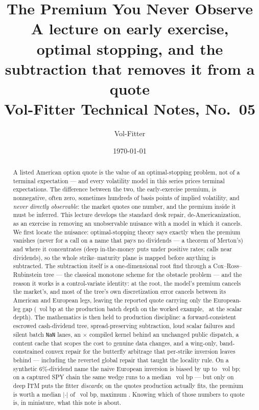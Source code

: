 \documentclass[11pt]{article}
\title{\textbf{The Premium You Never Observe}\\[2pt]
\large A lecture on early exercise, optimal stopping, and the subtraction
that removes it from a quote\\[2pt]
\normalsize Vol-Fitter Technical Notes, No.~05}
\author{Vol-Fitter}
\date{\today}
\begin{document}
\maketitle




\begin{abstract}
A listed American option quote is the value of an optimal-stopping problem,
not of a terminal expectation --- and every volatility model in this series
prices terminal expectations.  The difference between the two, the
early-exercise premium, is nonnegative, often zero, sometimes hundreds of
basis points of implied volatility, and \emph{never directly observable}:
the market quotes one number, and the premium inside it must be inferred.
This lecture develops the standard desk repair, de-Americanization, as an
exercise in removing an unobservable nuisance with a model in which it
cancels.  We first locate the nuisance: optimal-stopping theory says
exactly when the premium vanishes (never for a call on a name that pays no
dividends --- a theorem of Merton's) and where it concentrates (deep
in-the-money puts under positive rates; calls near dividends), so the whole
strike--maturity plane is mapped before anything is subtracted.  The
subtraction itself is a one-dimensional root find through a
Cox--Ross--Rubinstein tree --- the classical monotone scheme for the
obstacle problem --- and the reason it works is a control-variate identity:
at the root, the model's premium cancels the market's, and most of the
tree's own discretization error cancels between its American and European
legs, leaving the reported quote carrying only the European-leg gap
(\deamstdepthbp\ vol bp at the production batch depth on the worked
example, \deamstdepthbpscalar\ at the scalar depth).  The mathematics is
then held to production discipline: a forward-consistent escrowed
cash-dividend tree, spread-preserving subtraction, loud scalar failures and
silent batch \texttt{NaN} lanes, an \deamspeedup$\times$ compiled kernel
behind an unchanged public dispatch, a content cache that scopes the cost
to genuine data changes, and a wing-only, band-constrained convex repair
for the butterfly arbitrage that per-strike inversion leaves behind ---
including the reverted global repair that taught the locality rule.  On a
synthetic $6\%$-dividend name the naive European inversion is biased by up
to \deamstmaxbias\ vol bp; on a captured SPY chain the same wedge runs to a
median \deamstrealmedianitm\ vol bp --- but only on deep ITM puts the
fitter \emph{discards}; on the quotes production actually fits, the
premium is worth a median $|\cdot|$ of \deamstselabsmedian\ vol bp,
maximum \deamstselmax.  Knowing which of those numbers to quote is, in
miniature, what this note is about.
\end{abstract}
\end{document}
